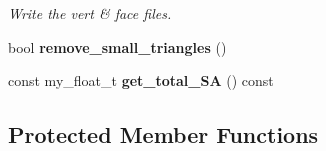 \begin{CompactItemize}
\begin{CompactList}\small\item\em Write the vert \& face files. \item\end{CompactList}\item 
bool \textbf{remove\_\-small\_\-triangles} ()\label{classASCbase_1_1geometry_1_1SimpleTrimeshTwo_b0a5b063bc1990180216eb8971d08595}

\item 
const my\_\-float\_\-t \textbf{get\_\-total\_\-SA} () const \label{classASCbase_1_1geometry_1_1SimpleTrimeshTwo_5147d4bb728ecc4302a4750073d23e8a}

\end{CompactItemize}
\subsection*{Protected Member Functions}
